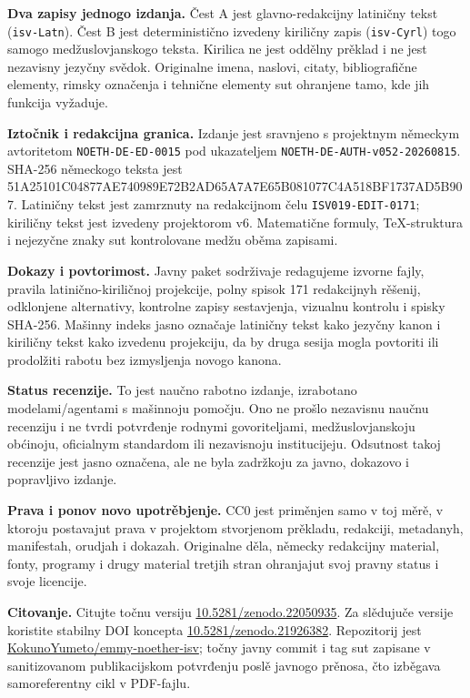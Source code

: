 \documentclass[11pt]{article}
\newcommand{\doiurl}[1]{\href{https://doi.org/#1}{#1}}
\newcommand{\repo}{\href{https://github.com/KokunoYumeto/emmy-noether-isv}{KokunoYumeto/emmy-noether-isv}}
\newcommand{\smallhash}[1]{{\ttfamily\footnotesize #1}}
\begin{document}
\textbf{Dva zapisy jednogo izdanja.} Čest A jest glavno-redakcijny latiničny tekst (\texttt{isv-Latn}). Čest B jest deterministično izvedeny kiriličny zapis (\texttt{isv-Cyrl}) togo samogo medžuslovjanskogo teksta. Kirilica ne jest oddělny prěklad i ne jest nezavisny jezyčny svědok. Originalne imena, naslovi, citaty, bibliografične elementy, rimsky označenja i tehnične elementy sut ohranjene tamo, kde jih funkcija vyžaduje.

\textbf{Iztočnik i redakcijna granica.} Izdanje jest sravnjeno s projektnym německym avtoritetom \texttt{NOETH-DE-ED-0015} pod ukazateljem \texttt{NOETH-DE-AUTH-v052-20260815}. SHA-256 německogo teksta jest
\smallhash{51A25101C04877AE740989E72B2AD65A7A7E65B081077C4A518BF1737AD5B907}.
Latiničny tekst jest zamrznuty na redakcijnom čelu \texttt{ISV019-EDIT-0171}; kiriličny tekst jest izvedeny projektorom v6. Matematične formuly, TeX-struktura i nejezyčne znaky sut kontrolovane medžu oběma zapisami.

\textbf{Dokazy i povtorimost.} Javny paket sodrživaje redagujeme izvorne fajly, pravila latinično-kiriličnoj projekcije, polny spisok 171 redakcijnyh rěšenij, odklonjene alternativy, kontrolne zapisy sestavjenja, vizualnu kontrolu i spisky SHA-256. Mašinny indeks jasno označaje latiničny tekst kako jezyčny kanon i kiriličny tekst kako izvedenu projekciju, da by druga sesija mogla povtoriti ili prodolžiti rabotu bez izmysljenja novogo kanona.

\textbf{Status recenzije.} To jest naučno rabotno izdanje, izrabotano modelami/agentami s mašinnoju pomočju. Ono ne prošlo nezavisnu naučnu recenziju i ne tvrdi potvrđenje rodnymi govoriteljami, medžuslovjanskoju obćinoju, oficialnym standardom ili nezavisnoju institucijeju. Odsutnost takoj recenzije jest jasno označena, ale ne byla zadržkoju za javno, dokazovo i popravljivo izdanje.

\textbf{Prava i ponov novo upotrěbjenje.} CC0 jest priměnjen samo v toj měrě, v ktoroju postavajut prava v projektom stvorjenom prěkladu, redakciji, metadanyh, manifestah, orudjah i dokazah. Originalne děla, německy redakcijny material, fonty, programy i drugy material tretjih stran ohranjajut svoj pravny status i svoje licencije.

\textbf{Citovanje.} Citujte točnu versiju \doiurl{10.5281/zenodo.22050935}. Za slědujuče versije koristite stabilny DOI koncepta \doiurl{10.5281/zenodo.21926382}. Repozitorij jest \repo; točny javny commit i tag sut zapisane v sanitizovanom publikacijskom potvrđenju poslě javnogo prěnosa, čto izběgava samoreferentny cikl v PDF-fajlu.
\clearpage
\end{document}
